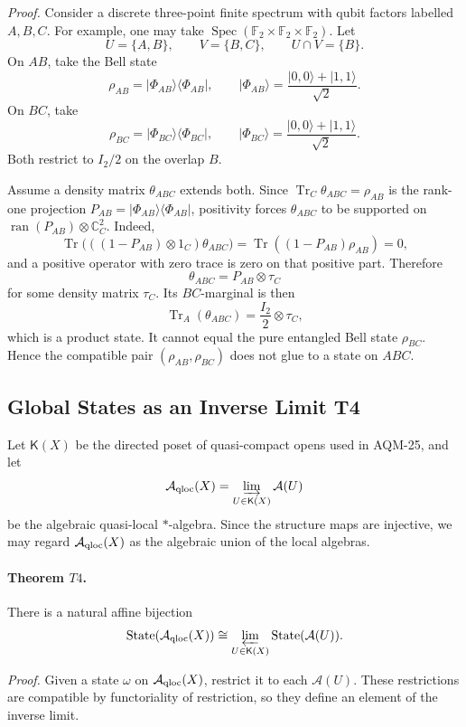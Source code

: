 \emph{Proof.}
Consider a discrete three-point finite spectrum with qubit factors labelled
\(A,B,C\).  For example, one may take
\(\operatorname{Spec}(\mathbb F_2\times\mathbb F_2\times\mathbb F_2)\).
Let
\[
  U=\{A,B\},\qquad V=\{B,C\},\qquad U\cap V=\{B\}.
\]
On \(AB\), take the Bell state
\[
  \rho_{AB}=|\Phi_{AB}\rangle\langle\Phi_{AB}|,\qquad
  |\Phi_{AB}\rangle=\frac{|0,0\rangle+|1,1\rangle}{\sqrt2}.
\]
On \(BC\), take
\[
  \rho_{BC}=|\Phi_{BC}\rangle\langle\Phi_{BC}|,\qquad
  |\Phi_{BC}\rangle=\frac{|0,0\rangle+|1,1\rangle}{\sqrt2}.
\]
Both restrict to \(I_2/2\) on the overlap \(B\).

Assume a density matrix \(\theta_{ABC}\) extends both.  Since
\(\operatorname{Tr}_C\theta_{ABC}=\rho_{AB}\) is the rank-one projection
\(P_{AB}=|\Phi_{AB}\rangle\langle\Phi_{AB}|\), positivity forces
\(\theta_{ABC}\) to be supported on
\(\operatorname{ran}(P_{AB})\otimes\mathbb C^2_C\).  Indeed,
\[
  \operatorname{Tr}\bigl(((1-P_{AB})\otimes1_C)\theta_{ABC}\bigr)
  =
  \operatorname{Tr}((1-P_{AB})\rho_{AB})=0,
\]
and a positive operator with zero trace is zero on that positive part.
Therefore
\[
  \theta_{ABC}=P_{AB}\otimes\tau_C
\]
for some density matrix \(\tau_C\).  Its \(BC\)-marginal is then
\[
  \operatorname{Tr}_A(\theta_{ABC})
  =
  \frac{I_2}{2}\otimes\tau_C,
\]
which is a product state.  It cannot equal the pure entangled Bell state
\(\rho_{BC}\).  Hence the compatible pair \((\rho_{AB},\rho_{BC})\) does not
glue to a state on \(ABC\).

\subsection{Global States as an Inverse Limit T4}

Let \(\mathsf K(X)\) be the directed poset of quasi-compact opens used in
AQM-25, and let
\[
  \mathcal A_{\rm qloc}(X)=\varinjlim_{U\in\mathsf K(X)}\mathcal A(U)
\]
be the algebraic quasi-local \(*\)-algebra.  Since the structure maps are
injective, we may regard \(\mathcal A_{\rm qloc}(X)\) as the algebraic union
of the local algebras.

\paragraph{Theorem \(T4\).}
There is a natural affine bijection
\[
  \operatorname{State}(\mathcal A_{\rm qloc}(X))
  \cong
  \varprojlim_{U\in\mathsf K(X)}
  \operatorname{State}(\mathcal A(U)).
\]

\emph{Proof.}
Given a state \(\omega\) on \(\mathcal A_{\rm qloc}(X)\), restrict it to each
\(\mathcal A(U)\).  These restrictions are compatible by functoriality of
restriction, so they define an element of the inverse limit.


